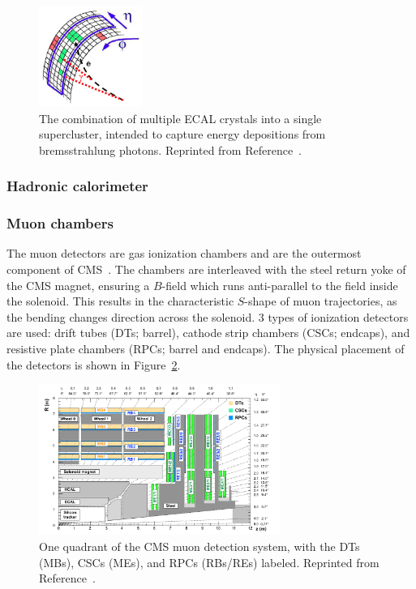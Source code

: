 \begin{figure}[]
    \begin{center} 
        \includegraphics[width=0.3\textwidth]{figures/cms/sc.png}
        \caption{The combination of multiple ECAL crystals into a single supercluster, intended to capture energy depositions from bremsstrahlung photons.
                  Reprinted from Reference~\cite{cmsecalrev}.}
        \label{fig:cms:sc}
    \end{center}
\end{figure}

\subsubsection{Hadronic calorimeter}

\subsubsection{Muon chambers}

The muon detectors are gas ionization chambers and are the outermost component of CMS~\cite{cmsmuon}. 
The chambers are interleaved with the steel return yoke of the CMS magnet, ensuring a $B$-field which runs anti-parallel to the field inside the solenoid.
This results in the characteristic $S$-shape of muon trajectories, as the bending changes direction across the solenoid. 
3 types of ionization detectors are used: drift tubes (DTs; barrel), cathode strip chambers (CSCs; endcaps), and resistive plate chambers (RPCs; barrel and endcaps).
The physical placement of the detectors is shown in Figure~\ref{fig:cms:muondet}.

\begin{figure}[]
	\begin{center}
		\includegraphics[width=0.7\textwidth]{figures/cms/muon.png}
		\caption{One quadrant of the CMS muon detection system, with the DTs (MBs), CSCs (MEs), and RPCs (RBs/REs) labeled. 
				 Reprinted from Reference~\cite{cmsmuon}.}
		\label{fig:cms:muondet}
	\end{center}
\end{figure}

